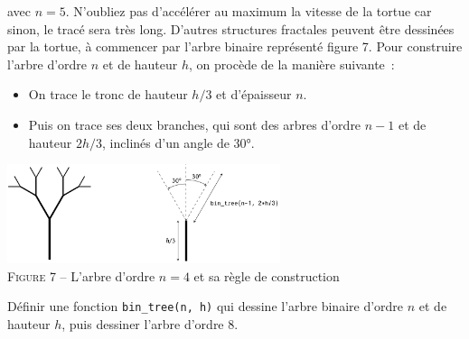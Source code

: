 \documentclass{magnolia}
\begin{document}
\begin{questions}
  avec $n=5$. N'oubliez pas d'accélérer au maximum la vitesse de la tortue car sinon, le tracé sera très long.
\enonce D'autres structures fractales peuvent être dessinées par la tortue, à commencer par l'arbre binaire
  représenté figure 7. Pour construire l'arbre d'ordre $n$ et de hauteur $h$, on procède de la manière
  suivante~:
  \begin{itemize}
  \item On trace le tronc de hauteur $h/3$ et d'épaisseur $n$.
  \item Puis on trace ses deux branches, qui sont des arbres d'ordre $n-1$ et de hauteur $2h/3$, inclinés
    d'un angle de \ang{30}.
  \end{itemize}
\begin{center}
\includegraphics[width=0.6\textwidth]{../../Commun/Images/python-tp-logo-7}\\
\textsc{Figure 7} -- L'arbre d'ordre $n=4$ et sa règle de construction
\end{center}
\question Définir une fonction \verb!bin_tree(n, h)! qui dessine l'arbre binaire d'ordre $n$ et de hauteur $h$,
  puis dessiner l'arbre d'ordre 8.
\end{questions}




\end{document}
